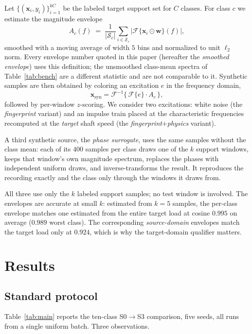\documentclass[preprint,12pt]{elsarticle}
\begin{document}
Let $\{(\mathbf{x}_i,y_i)\}_{i=1}^{kC}$ be the labeled target support set for
$C$ classes. For class $c$ we estimate the magnitude envelope
\begin{equation}
A_c(f) \;=\; \frac{1}{|\mathcal{S}_c|}\sum_{i \in \mathcal{S}_c}
\bigl|\mathcal{F}\{ \mathbf{x}_i \odot \mathbf{w} \}(f)\bigr|,
\end{equation}
smoothed with a moving average of width $5$ bins and normalized to unit $\ell_2$
norm. Every envelope number quoted in this paper (hereafter the \emph{smoothed
envelope}) uses this definition; the unsmoothed class-mean spectra of
Table~\ref{tab:bench} are a different statistic and are not comparable to it.
Synthetic samples are then obtained by coloring an excitation $e$ in the
frequency domain,
\begin{equation}
\mathbf{x}_{\text{syn}} = \mathcal{F}^{-1}\bigl\{\, \mathcal{F}\{e\} \cdot A_c \,\bigr\},
\end{equation}
followed by per-window $z$-scoring. We consider two excitations: white noise
(the \emph{fingerprint} variant) and an impulse train placed at the
characteristic frequencies recomputed at the \emph{target} shaft speed
(the \emph{fingerprint$+$physics} variant).

A third synthetic source, the \emph{phase surrogate}, uses the same samples
without the class mean: each of its $400$ samples per class draws one of the
$k$ support windows, keeps that window's own magnitude spectrum, replaces the
phases with independent uniform draws, and inverse-transforms the result. It
reproduces the recording exactly and the class only through the windows it
draws from.

All three use only the $k$ labeled support samples; no test window is
involved. The envelopes are accurate at small $k$: estimated from $k=5$
samples, the per-class envelope matches one estimated from the entire target
load at cosine $0.995$ on average ($0.989$ worst class). The corresponding
\emph{source-domain} envelopes match the target load only at $0.924$, which is
why the target-domain qualifier matters.

\section{Results}
\label{sec:results}

\subsection{Standard protocol}
Table~\ref{tab:main} reports the ten-class S0$\rightarrow$S3 comparison,
five seeds, all runs from a single uniform batch. Three observations.
\end{document}

